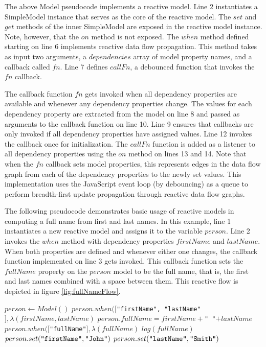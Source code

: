 The above Model pseudocode implements a reactive model. Line 2 instantiates a SimpleModel instance that serves as the core of the reactive model. The $set$ and $get$ methods of the inner SimpleModel are exposed in the reactive model instance. Note, however, that the $on$ method is not exposed. The $when$ method defined starting on line 6 implements reactive data flow propagation. This method takes as input two arguments, a $dependencies$ array of model property names, and a callback called $fn$. Line 7 defines $callFn$, a debounced function that invokes the $fn$ callback.

The callback function $fn$ gets invoked when all dependency properties are available and whenever any dependency properties change. The values for each dependency property are extracted from the model on line 8 and passed as arguments to the callback function on line 10. Line 9 ensures that callbacks are only invoked if all dependency properties have assigned values. Line 12 invokes the callback once for initialization. The $callFn$ function is added as a listener to all dependency properties using the $on$ method on lines 13 and 14. Note that when the $fn$ callback sets model properties, this represents edges in the data flow graph from each of the dependency properties to the newly set values. This implementation uses the JavaScript event loop (by debouncing) as a queue to perform breadth-first update propagation through reactive data flow graphs.

The following pseudocode demonstrates basic usage of reactive models in computing a full name from first and last names. In this example, line 1 instantiates a new reactive model and assigns it to the variable $person$. Line 2 invokes the $when$ method with dependency properties $firstName$ and $lastName$. When both properties are defined and whenever either one changes, the callback function implemented on line 3 gets invoked. This callback function sets the $fullName$ property on the $person$ model to be the full name, that is, the first and last names combined with a space between them. This reactive flow is depicted in figure \ref{fig:fullNameFlow}.

\begin{codebox}
\li $person \gets Model()$
\li $person.when([$\verb`"firstName", "lastName"`$], \lambda(firstName, lastName)$
\Do
  \li $person.fullName = firstName + $\verb`" "`$ + lastName$
\End
\li $person.when([$\verb`"fullName"`$], \lambda(fullName)$
\Do
  \li $log(fullName)$
\End
\li $person.set(\verb`"firstName"`, \verb`"John"`)$
\li $person.set(\verb`"lastName"`, \verb`"Smith"`)$
\end{codebox}

